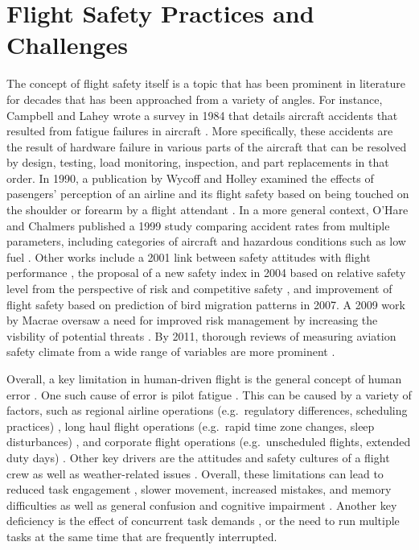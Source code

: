 \documentclass[12pt]{uthesis-v12}  %
\begin{document}
\section{Flight Safety Practices and Challenges}

The concept of flight safety itself is a topic that has been prominent in literature for decades that has been approached from a variety of angles. For instance, Campbell and Lahey wrote a survey in 1984 that details aircraft accidents that resulted from fatigue failures in aircraft \cite{campbell}. More specifically, these accidents are the result of hardware failure in various parts of the aircraft that can be resolved by design, testing, load monitoring, inspection, and part replacements in that order. In 1990, a publication by Wycoff and Holley examined the effects of pasengers' perception of an airline and its flight safety based on being touched on the shoulder or forearm by a flight attendant \cite{wycoff}. In a more general context, O'Hare and Chalmers published a 1999 study comparing accident rates from multiple parameters, including categories of aircraft and hazardous conditions such as low fuel \cite{ohare}. Other works include a 2001 link between safety attitudes with flight performance \cite{sexton}, the proposal of a new safety index in 2004 based on relative safety level from the perspective of risk and competitive safety \cite{chang2}, and improvement of flight safety based on prediction of bird migration patterns \cite{vanbelle} in 2007. A 2009 work by Macrae oversaw a need for improved risk management by increasing the visbility of potential threats \cite{macrae}. By 2011, thorough reviews of measuring aviation safety climate from a wide range of variables are more prominent \cite{oconnor}. 

Overall, a key limitation in human-driven flight is the general concept of human error \cite{dhillon,kirwan,kirwan2}. One such cause of error is pilot fatigue \cite{conway,caldwell,rosekind10}. This can be caused by a variety of factors, such as regional airline operations (e.g.~regulatory differences, scheduling practices) \cite{rosekind11}, long haul flight operations (e.g.~rapid time zone changes, sleep disturbances) \cite{rosekind12}, and corporate flight operations (e.g.~unscheduled flights, extended duty days) \cite{rosekind13}. Other key drivers are the attitudes and safety cultures of a flight crew \cite{sexton, remawi} as well as weather-related issues \cite{emo}. Overall, these limitations can lead to reduced task engagement \cite{matthews}, slower movement, increased mistakes, and memory difficulties \cite{caldwell} as well as general confusion and cognitive impairment \cite{west}. Another key deficiency is the effect of concurrent task demands \cite{louk}, or the need to run multiple tasks at the same time that are frequently interrupted.
\end{document}
